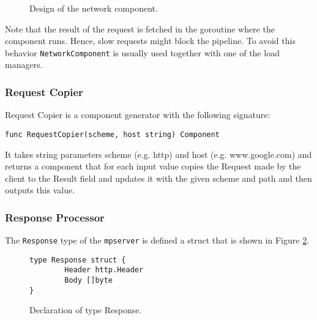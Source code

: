 \begin{figure}[h]
\centering
{}
\caption[scale=1.0]{Design of the network component.}
\label{fig:networkComp}
\end{figure}

Note that the result of the request is fetched in the goroutine where the
component runs. Hence, slow requests might block the pipeline. To avoid
this behavior \texttt{NetworkComponent} is usually used together with one
of the load managers.

\subsubsection{Request Copier}
Request Copier is a component generator with the following signature:
\begin{lstlisting}
func RequestCopier(scheme, host string) Component
\end{lstlisting}
It takes string parameters scheme (e.g. http) and host (e.g. www.google.com) 
and returns a component that for each input value copies the Request made 
by the client to the Result field and updates it with the given scheme and 
path and then outputs this value.

\subsubsection{Response Processor}
The \texttt{Response} type of the \texttt{mpserver} is defined a struct
that is shown in Figure \ref{fig:Response}.
\begin{figure}[h]
\centering
\begin{lstlisting}
type Response struct {
		Header http.Header
		Body []byte
}
\end{lstlisting}
\caption[scale=1.0]{Declaration of type Response.}
\label{fig:Response}
\end{figure}

